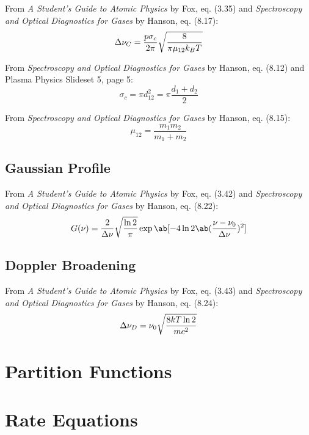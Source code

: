 \documentclass[11pt, twoside, fleqn]{report}
\begin{document}
From \textit{A Student's Guide to Atomic Physics} by Fox, eq. (3.35) and \textit{Spectroscopy and Optical Diagnostics for Gases} by Hanson, eq. (8.17):
\begin{equation*}
    \adif{\nu}_C = \frac{p\sigma_c}{2\pi}\sqrt{\frac{8}{\pi\mu_{12}k_BT}}
\end{equation*}

From \textit{Spectroscopy and Optical Diagnostics for Gases} by Hanson, eq. (8.12) and Plasma Physics Slideset 5, page 5:
\begin{equation*}
    \sigma_c = \pi d_{12}^2 = \pi\frac{d_1 + d_2}{2}
\end{equation*}

From \textit{Spectroscopy and Optical Diagnostics for Gases} by Hanson, eq. (8.15):
\begin{equation*}
    \mu_{12} = \frac{m_1m_2}{m_1 + m_2}
\end{equation*}

\subsection{Gaussian Profile}

From \textit{A Student's Guide to Atomic Physics} by Fox, eq. (3.42) and \textit{Spectroscopy and Optical Diagnostics for Gases} by Hanson, eq. (8.22):
\begin{equation*}
    G(\nu) = \frac{2}{\adif{\nu}}\sqrt{\frac{\ln{2}}{\pi}}\exp\ab[-4\ln{2}\ab(\frac{\nu - \nu_0}{\adif{\nu}})^2]
\end{equation*}

\subsection{Doppler Broadening}

From \textit{A Student's Guide to Atomic Physics} by Fox, eq. (3.43) and \textit{Spectroscopy and Optical Diagnostics for Gases} by Hanson, eq. (8.24):
\begin{equation*}
    \adif{\nu}_D = \nu_0\sqrt{\frac{8kT\ln{2}}{mc^2}}
\end{equation*}

\section{Partition Functions}

\section{Rate Equations}
\end{document}
